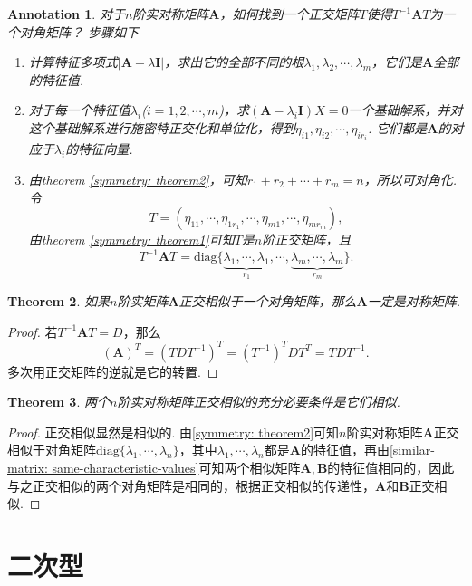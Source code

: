 \documentclass{article}
\newtheorem{theorem}{Theorem}[section]
\newtheorem{annotation}[theorem]{Annotation}
\newcommand{\mbf}[1]{\bm{#1}}
\begin{document}
\begin{annotation}
\rm {\color{red}对于$n$阶实对称矩阵$\mbf{A}$，如何找到一个正交矩阵$T$使得$T^{-1}\mbf{A}T$为一个对角矩阵}？ 步骤如下
\begin{enumerate}
	\item 计算特征多项式$|\mbf{A}-\lambda\mbf{I}|$，求出它的全部不同的根$\lambda_1,\lambda_2,\cdots,\lambda_m$，它们是$\mbf{A}$全部的特征值.
	\item 对于每一个特征值$\lambda_i$($i=1,2,\cdots,m$)，求$(\mbf{A}-\lambda_i\mbf{I})X=0$一个基础解系，并对这个基础解系进行施密特正交化和单位化，得到$\eta_{i1},\eta_{i2},\cdots,\eta_{ir_i}$. 它们都是$\mbf{A}$的对应于$\lambda_i$的特征向量. 
	\item 由theorem \ref{symmetry: theorem2}，可知$r_1 +r_2 +\cdots + r_m = n$，所以可对角化. 令
	$$
	T = (\eta_{11},\cdots,\eta_{1r_1},\cdots,\eta_{m1},\cdots,\eta_{mr_m}),
	$$
	由theorem \ref{symmetry: theorem1}可知$T$是$n$阶正交矩阵，且
	$$
	T^{-1}\mbf{A}T = \text{diag}\{\underbrace{\lambda_1,\cdots,\lambda_1}_{r_1},\cdots,\underbrace{\lambda_m,\cdots,\lambda_m}_{r_m}\}.
	$$
\end{enumerate}
\end{annotation}

\begin{theorem}
\rm 如果$n$阶实矩阵$\mbf{A}$正交相似于一个对角矩阵，那么$\mbf{A}$一定是对称矩阵.
\end{theorem}

\begin{proof}
若$T^{-1}\mbf{A}T = D$，那么
$$
(\mbf{A})^T = (TDT^{-1})^T = (T^{-1})^TDT^T = TDT^{-1}.
$$
多次用正交矩阵的逆就是它的转置. 
\end{proof}


\begin{theorem}
\rm 两个$n$阶实对称矩阵正交相似的充分必要条件是它们相似.
\end{theorem}

\begin{proof}
正交相似显然是相似的. 由\ref{symmetry: theorem2}可知$n$阶实对称矩阵$\mbf{A}$正交相似于对角矩阵$\text{diag}\{\lambda_1,\cdots,\lambda_n\}$，其中$\lambda_1,\cdots,\lambda_n$都是$\mbf{A}$的特征值，再由\ref{similar-matrix: same-characteristic-values}可知两个相似矩阵$\mbf{A},\mbf{B}$的特征值相同的，因此与之正交相似的两个对角矩阵是相同的，根据正交相似的传递性，$\mbf{A}$和$\mbf{B}$正交相似. 
\end{proof}


\newpage
\section{二次型}
\end{document}
